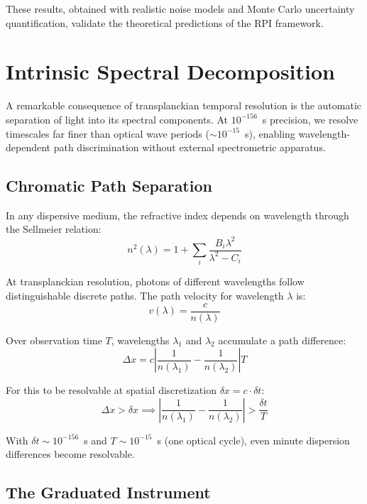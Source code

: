 \documentclass[twocolumn,10pt,a4paper]{article}
\begin{document}
These results, obtained with realistic noise models and Monte Carlo uncertainty quantification, validate the theoretical predictions of the RPI framework.

\section{Intrinsic Spectral Decomposition}

A remarkable consequence of transplanckian temporal resolution is the automatic separation of light into its spectral components. At $10^{-156}$~s precision, we resolve timescales far finer than optical wave periods ($\sim 10^{-15}$~s), enabling wavelength-dependent path discrimination without external spectrometric apparatus.

\subsection{Chromatic Path Separation}

In any dispersive medium, the refractive index depends on wavelength through the Sellmeier relation:
\begin{equation}
n^2(\lambda) = 1 + \sum_i \frac{B_i \lambda^2}{\lambda^2 - C_i}
\end{equation}

At transplanckian resolution, photons of different wavelengths follow distinguishable discrete paths. The path velocity for wavelength $\lambda$ is:
\begin{equation}
v(\lambda) = \frac{c}{n(\lambda)}
\end{equation}

Over observation time $T$, wavelengths $\lambda_1$ and $\lambda_2$ accumulate a path difference:
\begin{equation}
\Delta x = c \left| \frac{1}{n(\lambda_1)} - \frac{1}{n(\lambda_2)} \right| T
\end{equation}

For this to be resolvable at spatial discretization $\delta x = c \cdot \delta t$:
\begin{equation}
\Delta x > \delta x \implies \left| \frac{1}{n(\lambda_1)} - \frac{1}{n(\lambda_2)} \right| > \frac{\delta t}{T}
\end{equation}

With $\delta t \sim 10^{-156}$~s and $T \sim 10^{-15}$~s (one optical cycle), even minute dispersion differences become resolvable.

\subsection{The Graduated Instrument}
\end{document}
